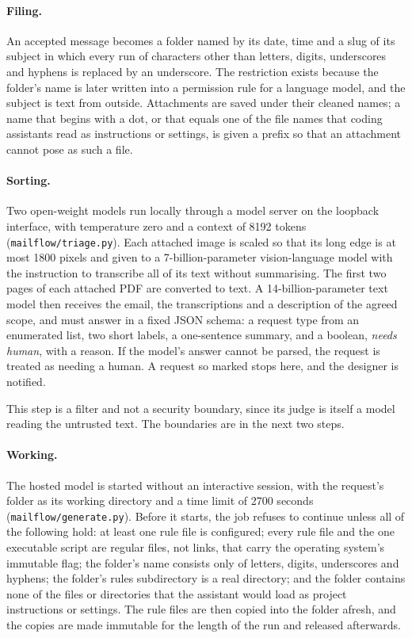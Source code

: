 \documentclass[sigconf,nonacm]{acmart}
\newcommand{\code}[1]{\textnormal{\texttt{\small #1}}}
\begin{document}
\paragraph{Filing.}
An accepted message becomes a folder named by its date, time and a slug of its subject in
which every run of characters other than letters, digits, underscores and hyphens is replaced
by an underscore. The restriction exists because the folder's name is later written into a
permission rule for a language model, and the subject is text from outside. Attachments are
saved under their cleaned names; a name that begins with a dot, or that equals one of the file
names that coding assistants read as instructions or settings, is given a prefix so that an
attachment cannot pose as such a file.

\paragraph{Sorting.}
Two open-weight models run locally through a model server on the loopback interface, with
temperature zero and a context of 8192 tokens (\code{mailflow/triage.py}). Each attached image
is scaled so that its long edge is at most 1800 pixels and given to a 7-billion-parameter
vision-language model with the instruction to transcribe all of its text without summarising.
The first two pages of each attached PDF are converted to text. A 14-billion-parameter text
model then receives the email, the transcriptions and a description of the agreed scope, and
must answer in a fixed JSON schema: a request type from an enumerated list, two short labels,
a one-sentence summary, and a boolean, \emph{needs human}, with a reason. If the model's answer
cannot be parsed, the request is treated as needing a human. A request so marked stops here,
and the designer is notified.

This step is a filter and not a security boundary, since its judge is itself a model reading
the untrusted text. The boundaries are in the next two steps.

\paragraph{Working.}
The hosted model is started without an interactive session, with the request's folder as its
working directory and a time limit of 2700 seconds (\code{mailflow/generate.py}). Before it
starts, the job refuses to continue unless all of the following hold: at least one rule file is
configured; every rule file and the one executable script are regular files, not links, that
carry the operating system's immutable flag; the folder's name consists only of letters,
digits, underscores and hyphens; the folder's rules subdirectory is a real directory; and the
folder contains none of the files or directories that the assistant would load as project
instructions or settings. The rule files are then copied into the folder afresh, and the
copies are made immutable for the length of the run and released afterwards.
\end{document}
